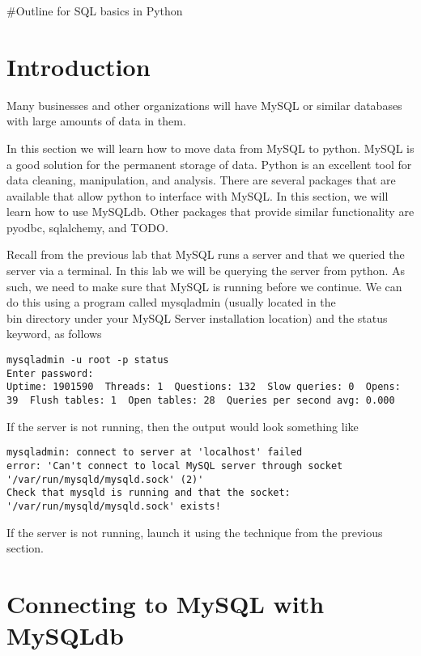 #Outline for SQL basics in Python
\label{lab:DbPython}

\section*{Introduction}
Many businesses and other organizations will have MySQL or similar databases with large amounts of data in them.  

In this section we will learn how to move data from MySQL to python.  MySQL is a good solution for the permanent storage of data.  Python is an excellent tool for data cleaning, manipulation, and analysis.   There are several packages that are available that allow python to interface with MySQL.  In this section, we will learn how to use MySQLdb.  Other packages that provide similar functionality are pyodbc, sqlalchemy, and TODO.

Recall from the previous lab that MySQL runs a server and that we queried the server via a terminal.  In this lab we will be querying the server from python.  As such, we need to make sure that MySQL is running before we continue.  We can do this using a program called mysqladmin (usually located in the \\bin directory under your MySQL Server installation location) and the status keyword, as follows

\begin{lstlisting}[style=ShellInput]
mysqladmin -u root -p status
Enter password: 
Uptime: 1901590  Threads: 1  Questions: 132  Slow queries: 0  Opens: 39  Flush tables: 1  Open tables: 28  Queries per second avg: 0.000
\end{lstlisting}

If the server is not running, then the output would look something like

\begin{lstlisting}[style=ShellInput]
mysqladmin: connect to server at 'localhost' failed
error: 'Can't connect to local MySQL server through socket '/var/run/mysqld/mysqld.sock' (2)'
Check that mysqld is running and that the socket: '/var/run/mysqld/mysqld.sock' exists!

\end{lstlisting}

If the server is not running, launch it using the technique from the previous section.

\section{Connecting to MySQL with MySQLdb}

